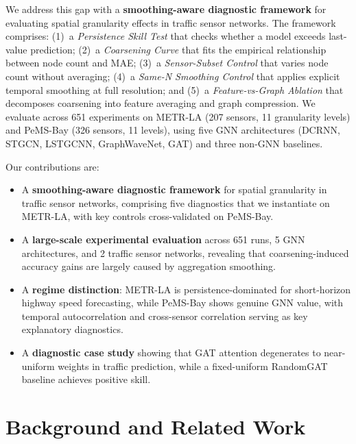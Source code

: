 \documentclass[sigconf]{acmart}
\begin{document}
We address this gap with a \textbf{smoothing-aware diagnostic framework} for evaluating spatial granularity effects in traffic sensor networks. The framework comprises: (1)~a \textit{Persistence Skill Test} that checks whether a model exceeds last-value prediction; (2)~a \textit{Coarsening Curve} that fits the empirical relationship between node count and MAE; (3)~a \textit{Sensor-Subset Control} that varies node count without averaging; (4)~a \textit{Same-N Smoothing Control} that applies explicit temporal smoothing at full resolution; and (5)~a \textit{Feature-vs-Graph Ablation} that decomposes coarsening into feature averaging and graph compression. We evaluate across 651 experiments on METR-LA (207 sensors, 11 granularity levels) and PeMS-Bay (326 sensors, 11 levels), using five GNN architectures (DCRNN, STGCN, LSTGCNN, GraphWaveNet, GAT) and three non-GNN baselines.

Our contributions are:
\begin{itemize}
    \item A \textbf{smoothing-aware diagnostic framework} for spatial granularity in traffic sensor networks, comprising five diagnostics that we instantiate on METR-LA, with key controls cross-validated on PeMS-Bay.
    \item A \textbf{large-scale experimental evaluation} across 651 runs, 5 GNN architectures, and 2 traffic sensor networks, revealing that coarsening-induced accuracy gains are largely caused by aggregation smoothing.
    \item A \textbf{regime distinction}: METR-LA is persistence-dominated for short-horizon highway speed forecasting, while PeMS-Bay shows genuine GNN value, with temporal autocorrelation and cross-sensor correlation serving as key explanatory diagnostics.
    \item A \textbf{diagnostic case study} showing that GAT attention degenerates to near-uniform weights in traffic prediction, while a fixed-uniform RandomGAT baseline achieves positive skill.
\end{itemize}

\section{Background and Related Work}
\end{document}
